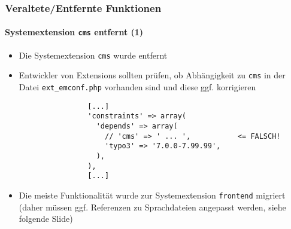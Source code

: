 %

\begin{frame}[fragile]
	\frametitle{Veraltete/Entfernte Funktionen}
	\framesubtitle{Systemextension \texttt{cms} entfernt (1)}

	\lstset{basicstyle=\tiny\ttfamily}

	\begin{itemize}

		\item Die Systemextension \texttt{cms} wurde entfernt

		\item Entwickler von Extensions sollten prüfen, ob Abhängigkeit zu \texttt{cms} in der Datei \texttt{ext\_emconf.php}
			vorhanden sind und diese ggf. korrigieren

			\begin{lstlisting}
				[...]
				'constraints' => array(
				  'depends' => array(
				    // 'cms' => ' ... ',           <= FALSCH!
				    'typo3' => '7.0.0-7.99.99',
				  ),
				),
				[...]
			\end{lstlisting}

		\item Die meiste Funktionalität wurde zur Systemextension \texttt{frontend} migriert
			(daher müssen ggf. Referenzen zu Sprachdateien angepasst werden, siehe folgende Slide)

	\end{itemize}

\end{frame}


